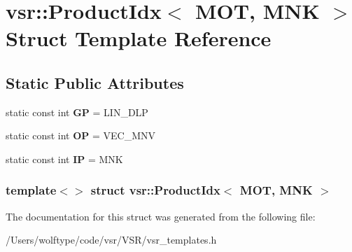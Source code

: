 \hypertarget{structvsr_1_1_product_idx_3_01_m_o_t_00_01_m_n_k_01_4}{\section{vsr\-:\-:Product\-Idx$<$ M\-O\-T, M\-N\-K $>$ Struct Template Reference}
\label{structvsr_1_1_product_idx_3_01_m_o_t_00_01_m_n_k_01_4}
}
\subsection*{Static Public Attributes}
\begin{DoxyCompactItemize}
\item 
\hypertarget{structvsr_1_1_product_idx_3_01_m_o_t_00_01_m_n_k_01_4_afa430053f069c6d9ff93152e8588fb38}{static const int {\bfseries G\-P} = L\-I\-N\-\_\-\-D\-L\-P}\label{structvsr_1_1_product_idx_3_01_m_o_t_00_01_m_n_k_01_4_afa430053f069c6d9ff93152e8588fb38}

\item 
\hypertarget{structvsr_1_1_product_idx_3_01_m_o_t_00_01_m_n_k_01_4_aa7e3f714058b583f5980d240d0f20a67}{static const int {\bfseries O\-P} = V\-E\-C\-\_\-\-M\-N\-V}\label{structvsr_1_1_product_idx_3_01_m_o_t_00_01_m_n_k_01_4_aa7e3f714058b583f5980d240d0f20a67}

\item 
\hypertarget{structvsr_1_1_product_idx_3_01_m_o_t_00_01_m_n_k_01_4_a60304aa1aaf75e23bb6d58a8764507bc}{static const int {\bfseries I\-P} = M\-N\-K}\label{structvsr_1_1_product_idx_3_01_m_o_t_00_01_m_n_k_01_4_a60304aa1aaf75e23bb6d58a8764507bc}

\end{DoxyCompactItemize}
\subsubsection*{template$<$$>$ struct vsr\-::\-Product\-Idx$<$ M\-O\-T, M\-N\-K $>$}



The documentation for this struct was generated from the following file\-:\begin{DoxyCompactItemize}
\item 
/\-Users/wolftype/code/vsr/\-V\-S\-R/vsr\-\_\-templates.\-h\end{DoxyCompactItemize}

